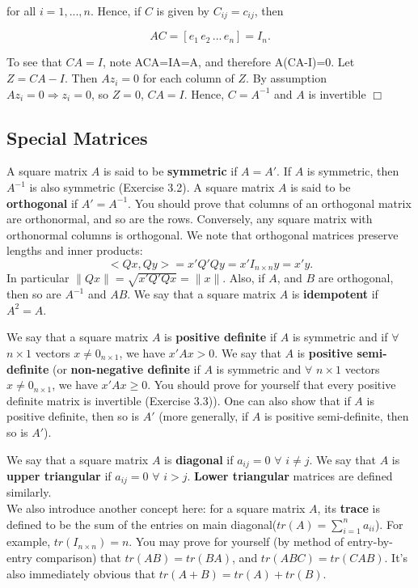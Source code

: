 \documentclass[12pt,oneside]{article}
\begin{document}
\begin{enumerate}
for all $i=1,...,n$.  Hence, if $C$ is given by $C_{ij} = c_{ij}$, then

\[AC = [e_1 \, e_2 \, ... \, e_n] = I_n. \]

To see that \(CA=I\), note ACA=IA=A, and therefore A(CA-I)=0. Let \(Z=CA-I\). Then \(Az_i=0\) for each column of \(Z\). By assumption \(Az_i=0 \Rightarrow z_i=0\), so \(Z=0\), \(CA=I\). Hence, $C = A^{-1}$ and \(A\) is invertible $\Box$



\end{enumerate}


\subsection{Special Matrices}

A square matrix $A$ is said to be \textbf{symmetric} if $A = A'$. If
$A$ is symmetric, then $A^{-1}$ is also symmetric (Exercise 3.2). A
square matrix $A$ is said to be \textbf{orthogonal} if $A' =
A^{-1}$. You should prove that columns of an orthogonal matrix are
orthonormal, and so are the rows. Conversely, any square
matrix with orthonormal columns is orthogonal. We note that orthogonal
matrices preserve lengths and inner products: $$<Qx, Qy> = x'Q'Qy =
x'I_{n \times n}y = x'y.$$ In particular $\|Qx\|= \sqrt{x'Q'Qx} =
\|x\|$. Also, if $A$, and $B$ are orthogonal, then so are $A^{-1}$ and
$AB$. We say that a square matrix $A$ is \textbf{idempotent} if $A^2 = A$.

We say that a square matrix $A$ is \textbf{positive definite} if $A$
is symmetric and if $\forall$ $n \times 1$ vectors $x \neq 0_{n \times
  1}$, we have $x'Ax > 0$. We say that $A$ is \textbf{positive
  semi-definite} (or \textbf{non-negative definite} if $A$ is
symmetric and $\forall$ $n \times 1$ vectors $x \neq 0_{n \times 1}$,
we have $x'Ax \geq 0$. You should prove for yourself that every
positive definite matrix is invertible (Exercise 3.3)). One can also show that if $A$ is positive definite, then so is $A'$ (more
generally, if $A$ is positive semi-definite, then so is $A'$).

We say that a square matrix $A$ is \textbf{diagonal} if $a_{ij} = 0$
$\forall$ $i \neq j$. We say that $A$ is \textbf{upper triangular} if
$a_{ij} = 0$ $\forall$ $i > j$. \textbf{Lower triangular} matrices are
defined similarly.\\
We also introduce another concept here: for a square matrix $A$, its
\textbf{trace} is defined to be the sum of the entries on main
diagonal($tr(A) = \displaystyle\sum_{i=1}^{n} {a_{ii}}$). For example,
 $tr(I_{n \times n}) = n$. You may prove for yourself (by method of
 entry-by-entry comparison) that $tr(AB) = tr(BA)$, and $tr(ABC) =
 tr(CAB)$. It's also immediately obvious that $tr(A+B) = tr(A) + tr(B)$.
\end{document}
